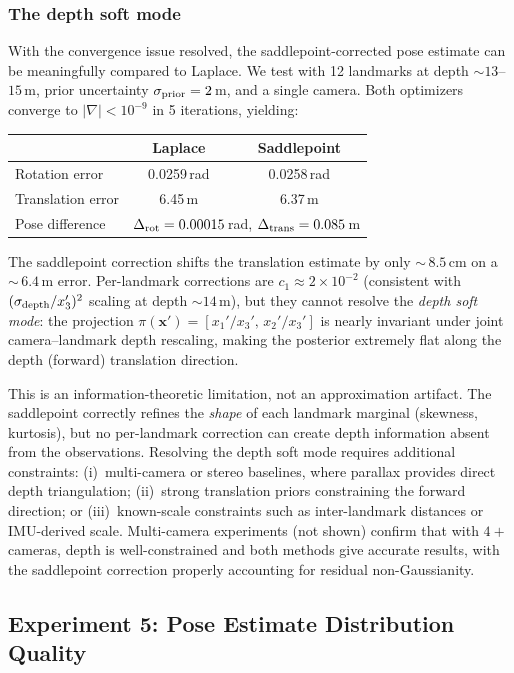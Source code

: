 \documentclass[journal]{IEEEtran}
\begin{document}
\subsubsection{The depth soft mode}

With the convergence issue resolved, the saddlepoint-corrected
pose estimate can be meaningfully compared to Laplace.
We test with 12 landmarks at depth $\sim\!13$--$15$\,m,
prior uncertainty $\sigma_{\rm prior} = 2$\,m,
and a single camera.
Both optimizers converge to $|\nabla| < 10^{-9}$ in 5 iterations,
yielding:
\begin{center}
\begin{tabular}{l|c|c}
 & Laplace & Saddlepoint \\
\hline
Rotation error & 0.0259\,rad & 0.0258\,rad \\
Translation error & 6.45\,m & 6.37\,m \\
Pose difference & \multicolumn{2}{c}{$\Delta_{\rm rot} = 0.00015$\,rad,
$\Delta_{\rm trans} = 0.085$\,m}
\end{tabular}
\end{center}
The saddlepoint correction shifts the translation estimate by
only ${\sim}\,8.5$\,cm on a ${\sim}\,6.4$\,m error.
Per-landmark corrections are $c_1 \approx 2 \times 10^{-2}$
(consistent with $(\sigma_{\rm depth}/x_3')^2$ scaling
at depth $\sim\!14$\,m), but they cannot resolve
the \emph{depth soft mode}: the projection
$\pi(\mathbf{x}') = [x_1'/x_3',\, x_2'/x_3']$ is
nearly invariant under joint camera--landmark depth rescaling,
making the posterior extremely flat along the
depth (forward) translation direction.

This is an information-theoretic limitation,
not an approximation artifact.
The saddlepoint correctly refines the \emph{shape}
of each landmark marginal (skewness, kurtosis),
but no per-landmark correction can create depth information
absent from the observations.
Resolving the depth soft mode requires additional constraints:
(i)~multi-camera or stereo baselines, where parallax
provides direct depth triangulation;
(ii)~strong translation priors constraining the forward direction;
or (iii)~known-scale constraints such as inter-landmark
distances or IMU-derived scale.
Multi-camera experiments (not shown)
confirm that with $4+$ cameras, depth is well-constrained
and both methods give accurate results, with the
saddlepoint correction properly accounting for residual
non-Gaussianity.

\subsection{Experiment 5: Pose Estimate Distribution Quality}
 
\end{document}
